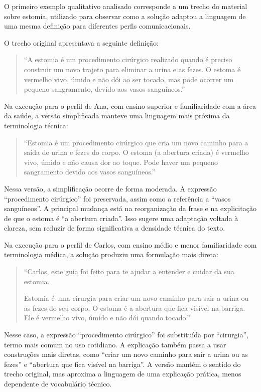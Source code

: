 O primeiro exemplo qualitativo analisado corresponde a um trecho do material sobre estomia, utilizado para observar como a solução adaptou a linguagem de uma mesma definição para diferentes perfis comunicacionais.

O trecho original apresentava a seguinte definição:

\begin{quote}
``A estomia é um procedimento cirúrgico realizado quando é preciso construir um novo trajeto para eliminar a urina e as fezes. O estoma é vermelho vivo, úmido e não dói ao ser tocado, mas pode ocorrer um pequeno sangramento, devido aos vasos sanguíneos.''
\end{quote}

Na execução para o perfil de Ana, com ensino superior e familiaridade com a área da saúde, a versão simplificada manteve uma linguagem mais próxima da terminologia técnica:

\begin{quote}
``Estomia é um procedimento cirúrgico que cria um novo caminho para a saída de urina e fezes do corpo. O estoma (a abertura criada) é vermelho vivo, úmido e não causa dor ao toque. Pode haver um pequeno sangramento devido aos vasos sanguíneos.''
\end{quote}

Nessa versão, a simplificação ocorre de forma moderada. A expressão ``procedimento cirúrgico'' foi preservada, assim como a referência a ``vasos sanguíneos''. A principal mudança está na reorganização da frase e na explicitação de que o estoma é ``a abertura criada''. Isso sugere uma adaptação voltada à clareza, sem reduzir de forma significativa a densidade técnica do texto.

Na execução para o perfil de Carlos, com ensino médio e menor familiaridade com terminologia médica, a solução produziu uma formulação mais direta:

\begin{quote}
``Carlos, este guia foi feito para te ajudar a entender e cuidar da sua estomia.

Estomia é uma cirurgia para criar um novo caminho para sair a urina ou as fezes do seu corpo. O estoma é a abertura que fica visível na barriga. Ele é vermelho vivo, úmido e não dói quando tocado.''
\end{quote}

Nesse caso, a expressão ``procedimento cirúrgico'' foi substituída por ``cirurgia'', termo mais comum no uso cotidiano. A explicação também passa a usar construções mais diretas, como ``criar um novo caminho para sair a urina ou as fezes'' e ``abertura que fica visível na barriga''. A versão mantém o sentido do trecho original, mas aproxima a linguagem de uma explicação prática, menos dependente de vocabulário técnico.

